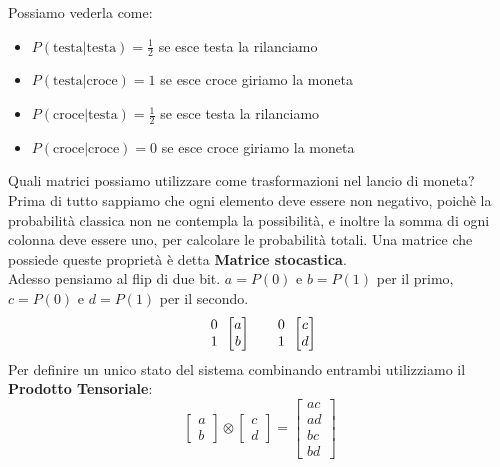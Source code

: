\documentclass{article}
\begin{document}
    Possiamo vederla come:
    \begin{itemize}
        \item $P(\text{testa}| \text{testa}) = \frac{1}{2}$ se esce testa la rilanciamo
        \item $P(\text{testa}| \text{croce}) = 1$ se esce croce giriamo la moneta
        \item $P(\text{croce}| \text{testa}) = \frac{1}{2}$ se esce testa la rilanciamo
        \item $P(\text{croce}| \text{croce}) = 0$ se esce croce giriamo la moneta
    \end{itemize}
    Quali matrici possiamo utilizzare come trasformazioni nel lancio di moneta?
    \\Prima di tutto sappiamo che ogni elemento deve essere non negativo, poichè la probabilità classica non ne contempla la possibilità, e inoltre la somma di ogni colonna deve essere uno, per calcolare le probabilità totali. Una matrice che possiede queste proprietà è detta \textbf{Matrice stocastica}.
    \medskip
    \\
    Adesso pensiamo al flip di due bit. $a =P(0)$ e $b =P(1)$ per il primo, $c =P(0)$ e $d =P(1)$ per il secondo. 
    $$
    \begin{array}{c}
         0 \\
         1 
    \end{array}
    \begin{bmatrix}
        a \\
        b
    \end{bmatrix}
    \hspace{0.5cm}
    \begin{array}{c}
         0 \\
         1 
    \end{array}
    \begin{bmatrix}
        c \\
        d
    \end{bmatrix}
    $$
    Per definire un unico stato del sistema combinando entrambi utilizziamo il \textbf{Prodotto Tensoriale}:
    $$
    \begin{bmatrix}
        a \\ b
    \end{bmatrix}
    \otimes
    \begin{bmatrix}
        c \\ d
    \end{bmatrix}
    = 
    \begin{bmatrix}
        ac \\ ad \\ bc \\bd
    \end{bmatrix}
    $$
\end{document}
